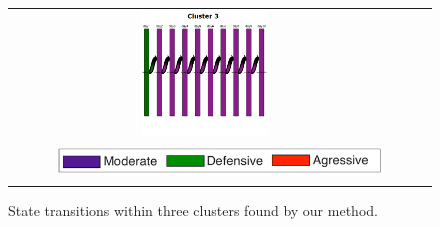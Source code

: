 \begin{figure}[h]
\begin{minipage}[b]{0.65\linewidth}
\begin{tabular}{ccc}
         \includegraphics[width=0.33\textwidth]{cluster3} \\
         \multicolumn{3}{c}{ \includegraphics[width=0.8\textwidth]{legend} }
         \end{tabular}
     \caption{\label{fig:clusters} State transitions within three clusters found by our method.}
\end{minipage}
\end{figure}

%


%
